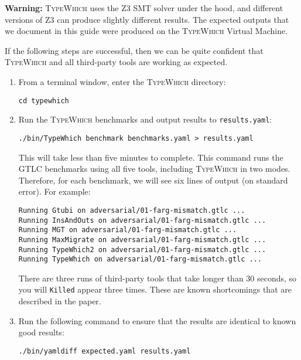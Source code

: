 \documentclass{book}
\newcommand{\system}{\textsc{TypeWhich}\xspace}
\begin{document}
\noindent
\textbf{Warning:} \system uses the Z3 SMT solver under the hood, and different
versions of Z3 can produce slightly different results. The expected outputs that
we document in this guide were produced on the \system Virtual Machine.

\medskip

\noindent
If the following steps are successful, then we can be quite confident that
\system and all third-party tools are working as expected.

\begin{enumerate}
     
\item From a terminal window, enter the \system directory:

\begin{verbatim}
cd typewhich
\end{verbatim}

\item Run the \system benchmarks and output results to \texttt{results.yaml}:

\begin{verbatim}
./bin/TypeWhich benchmark benchmarks.yaml > results.yaml
\end{verbatim}

This will take less than five minutes to complete. This command runs the GTLC
benchmarks using all five tools, including \system in two modes. Therefore, for
each benchmark, we will see six lines of output (on standard error). For example:
\begin{verbatim}
Running Gtubi on adversarial/01-farg-mismatch.gtlc ...
Running InsAndOuts on adversarial/01-farg-mismatch.gtlc ...
Running MGT on adversarial/01-farg-mismatch.gtlc ...
Running MaxMigrate on adversarial/01-farg-mismatch.gtlc ...
Running TypeWhich2 on adversarial/01-farg-mismatch.gtlc ...
Running TypeWhich on adversarial/01-farg-mismatch.gtlc ...
\end{verbatim}

There are three runs of third-party tools that take longer than 30 seconds, so you will \texttt{Killed} appear
three times. These are known shortcomings that are described in the paper.

\item Run the following command to ensure that the results are identical to
known good results:

\begin{verbatim}
./bin/yamldiff expected.yaml results.yaml
\end{verbatim}


\end{enumerate}
\end{document}
